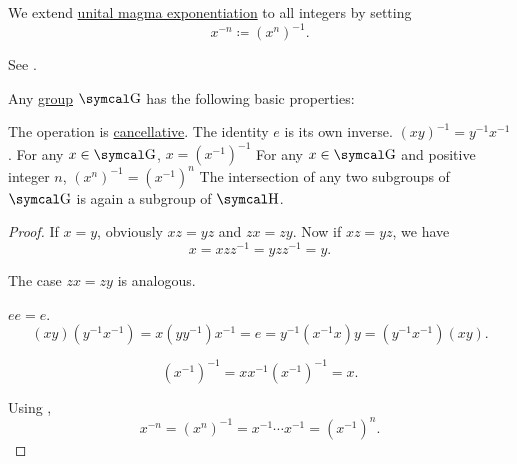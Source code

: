 \begin{definition}
\begin{DefEnum}
     We extend \hyperref[def:unital_magma/exponentiation]{unital magma exponentiation} to all integers by setting
    \begin{equation*}
      x^{-n} \coloneqq (x^n)^{-1}.
    \end{equation*}

    See .
  \end{DefEnum}
\end{definition}

\begin{proposition}\label{thm:group_properties}
  Any \hyperref[def:group]{group} \( \CG \) has the following basic properties:
  \begin{PropEnum}
     The operation is \hyperref[def:magma/cancellative]{cancellative}.
     The identity \( e \) is its own inverse.
     \( (xy)^{-1} = y^{-1} x^{-1} \).
     For any \( x \in \CG \), \( x = (x^{-1})^{-1} \)
     For any \( x \in \CG \) and positive integer \( n \), \( (x^n)^{-1} = (x^{-1})^n \)
     The intersection of any two subgroups of \( \CG \) is again a subgroup of \( \CH \).
  \end{PropEnum}
\end{proposition}
\begin{proof}
   If \( x = y \), obviously \( xz = yz \) and \( zx = zy \). Now if \( xz = yz \), we have
  \begin{equation*}
    x = xzz^{-1} = yzz^{-1} = y.
  \end{equation*}

  The case \( zx = zy \) is analogous.

   \( ee = e \).
  \begin{equation*}
    (xy) (y^{-1} x^{-1})
    =
    x (y y^{-1}) x^{-1}
    =
    e
    =
    y^{-1} (x^{-1} x) y
    =
    (y^{-1} x^{-1}) (xy).
  \end{equation*}

  \begin{equation*}
    (x^{-1})^{-1}
    =
    x x^{-1} (x^{-1})^{-1}
    =
    x.
  \end{equation*}

   Using ,
  \begin{equation*}
    x^{-n}
    =
    (x^n)^{-1}
    =
    x^{-1} \cdots x^{-1}
    =
    (x^{-1})^n.
  \end{equation*}
\end{proof}

